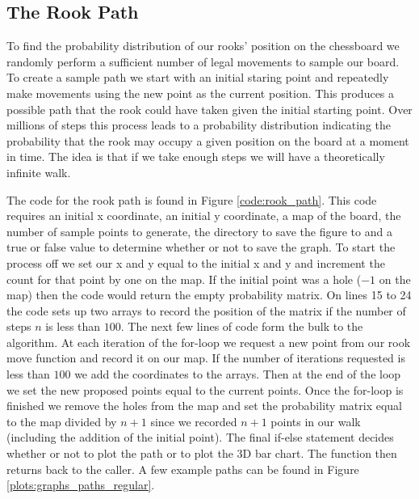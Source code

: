 \documentclass{amsart}
\numberwithin{equation}{section}
\begin{document}
\subsection{The Rook Path}
To find the probability distribution of our rooks' position on the chessboard we randomly perform a sufficient number of legal movements to sample our board. To create a sample path we start with an initial staring point and repeatedly make movements using the new point as the current position. This produces a possible path that the rook could have taken given the initial starting point. Over millions of steps this process leads to a probability distribution indicating the probability that the rook may occupy a given position on the board at a moment in time. The idea is that if we take enough steps we will have a theoretically infinite walk. \par
The code for the rook path is found in Figure \ref{code:rook_path}. This code requires an initial x coordinate, an initial y coordinate, a map of the board, the number of sample points to generate, the directory to save the figure to and a true or false value to determine whether or not to save the graph. To start the process off we set our x and y equal to the initial x and y and increment the count for that point by one on the map. If the initial point was a hole ($-1$ on the map) then the code would return the empty probability matrix. On lines 15 to 24 the code sets up two arrays to record the position of the matrix if the number of steps $n$ is less than $100$. The next few lines of code form the bulk to the algorithm. At each iteration of the for-loop we request a new point from our rook move function and record it on our map. If the number of iterations requested is less than $100$ we add the coordinates to the arrays. Then at the end of the loop we set the new proposed points equal to the current points. Once the for-loop is finished we remove the holes from the map and set the probability matrix equal to the map divided by $n+1$ since we recorded $n+1$ points in our walk (including the addition of the initial point). The final if-else statement decides whether or not to plot the path or to plot the 3D bar chart. The function then returns back to the caller. A few example paths can be found in Figure \ref{plots:graphs_paths_regular}.
\end{document}
